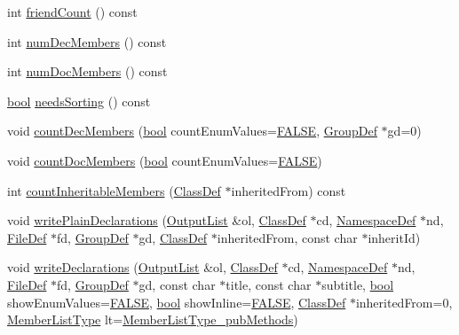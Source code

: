\begin{DoxyCompactItemize}
\item 
int \hyperlink{class_member_list_ad714927f44af6702e00c7bc20a2c907c}{friend\+Count} () const 
\item 
int \hyperlink{class_member_list_a90f6f81d021b9a33e1b7722bb97f5626}{num\+Dec\+Members} () const 
\item 
int \hyperlink{class_member_list_a51361640fd5f1bb1df63b4c347c516b8}{num\+Doc\+Members} () const 
\item 
\hyperlink{qglobal_8h_a1062901a7428fdd9c7f180f5e01ea056}{bool} \hyperlink{class_member_list_a179c35c04eb0c995e67b8c68af080bea}{needs\+Sorting} () const 
\item 
void \hyperlink{class_member_list_a66706c34a0b45bb65a60db005109f2f5}{count\+Dec\+Members} (\hyperlink{qglobal_8h_a1062901a7428fdd9c7f180f5e01ea056}{bool} count\+Enum\+Values=\hyperlink{qglobal_8h_a10e004b6916e78ff4ea8379be80b80cc}{F\+A\+L\+S\+E}, \hyperlink{class_group_def}{Group\+Def} $\ast$gd=0)
\item 
void \hyperlink{class_member_list_a44030afc5955a218b36b2129aed19402}{count\+Doc\+Members} (\hyperlink{qglobal_8h_a1062901a7428fdd9c7f180f5e01ea056}{bool} count\+Enum\+Values=\hyperlink{qglobal_8h_a10e004b6916e78ff4ea8379be80b80cc}{F\+A\+L\+S\+E})
\item 
int \hyperlink{class_member_list_a63d6899c5d1412b18e396695e014b9fc}{count\+Inheritable\+Members} (\hyperlink{class_class_def}{Class\+Def} $\ast$inherited\+From) const 
\item 
void \hyperlink{class_member_list_a6316876a572f8fc044aa7929b6b57eae}{write\+Plain\+Declarations} (\hyperlink{class_output_list}{Output\+List} \&ol, \hyperlink{class_class_def}{Class\+Def} $\ast$cd, \hyperlink{class_namespace_def}{Namespace\+Def} $\ast$nd, \hyperlink{class_file_def}{File\+Def} $\ast$fd, \hyperlink{class_group_def}{Group\+Def} $\ast$gd, \hyperlink{class_class_def}{Class\+Def} $\ast$inherited\+From, const char $\ast$inherit\+Id)
\item 
void \hyperlink{class_member_list_ab5c264ca14dfd80e23dbff43cabf1771}{write\+Declarations} (\hyperlink{class_output_list}{Output\+List} \&ol, \hyperlink{class_class_def}{Class\+Def} $\ast$cd, \hyperlink{class_namespace_def}{Namespace\+Def} $\ast$nd, \hyperlink{class_file_def}{File\+Def} $\ast$fd, \hyperlink{class_group_def}{Group\+Def} $\ast$gd, const char $\ast$title, const char $\ast$subtitle, \hyperlink{qglobal_8h_a1062901a7428fdd9c7f180f5e01ea056}{bool} show\+Enum\+Values=\hyperlink{qglobal_8h_a10e004b6916e78ff4ea8379be80b80cc}{F\+A\+L\+S\+E}, \hyperlink{qglobal_8h_a1062901a7428fdd9c7f180f5e01ea056}{bool} show\+Inline=\hyperlink{qglobal_8h_a10e004b6916e78ff4ea8379be80b80cc}{F\+A\+L\+S\+E}, \hyperlink{class_class_def}{Class\+Def} $\ast$inherited\+From=0, \hyperlink{types_8h_abe8ad5992f8938a28f918f51b199aa19}{Member\+List\+Type} lt=\hyperlink{types_8h_abe8ad5992f8938a28f918f51b199aa19aef8f34581b3661954fb301bd03cab7ac}{Member\+List\+Type\+\_\+pub\+Methods})

\end{DoxyCompactItemize}

